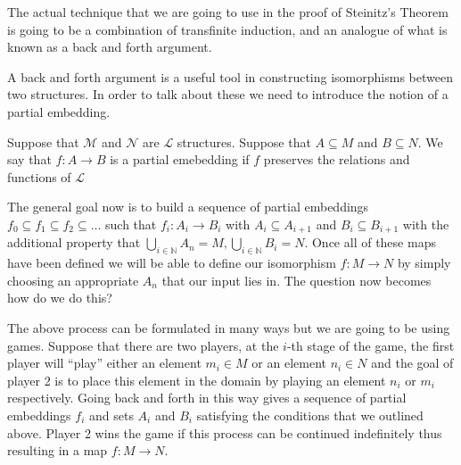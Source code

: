The actual technique that we are going to use in the proof of Steinitz's
Theorem is going to be a combination of transfinite induction, and an analogue
of what is known as a back and forth argument.

A back and forth argument is a useful tool in constructing isomorphisms between
two structures. In order to talk about these we need to introduce the notion of
a partial embedding.

\begin{defn}
  Suppose that $\mathcal{M}$ and $\mathcal{N}$ are $\mathcal{L}$ structures.
  Suppose that $A \subseteq M$ and $B \subseteq N$. We say that $f: A \to B$ is
  a partial emebedding if $f$
  preserves the relations and functions of $\mathcal{L}$ 
\end{defn}

The general goal now is to build a sequence of partial embeddings $f_{0}
\subseteq f_{1} \subseteq f_{2} \subseteq \ldots$ such that $f_{i}: A_{i}
\to B_{i}$ with $A_{i} \subseteq A_{i + 1}$ and $B_{i} \subseteq B_{i + 1}$
with the additional property that $\bigcup_{i \in \mathbb{N}} A_n = M,
\bigcup_{i \in \mathbb{N}} B_{i} = N$. Once all of these maps have been defined
we will be able to define our isomorphism $f: M \to N$ by simply choosing an
appropriate $A_{n}$ that our input lies in. The question now becomes how do we
do this?

The above process can be formulated in many ways but we are going to be using
games. Suppose that there are two players,
at the $i$-th stage of the game, the first player will ``play'' either an
element $m_{i} \in M$ or an element $n_{i} \in N$ and the goal of player 2 is
to place this element in the domain by playing an element $n_{i}$ or $m_{i}$
respectively. Going back and forth in this way gives a sequence of partial
embeddings $f_{i}$ and sets $A_{i}$ and $B_{i}$ satisfying the conditions that
we outlined above. Player 2 wins the game if this process can be continued
indefinitely thus resulting in a map $f: M \to N$. 

